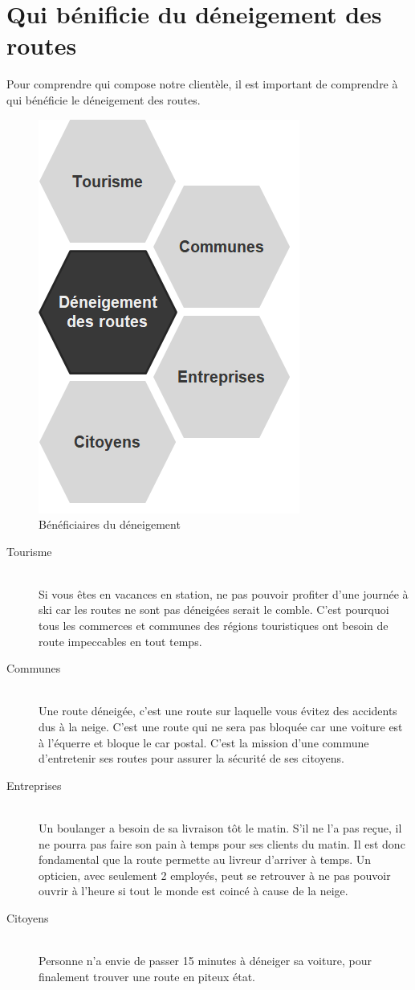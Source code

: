 \section{Qui bénificie du déneigement des routes}
Pour comprendre qui compose notre clientèle, il est important de comprendre à qui
bénéficie le déneigement des routes.

\begin{figure}[H]
    \centering
    \includegraphics[width=0.25\linewidth]{Images/business/beneficiaires.png}
    \caption[]{Bénéficiaires du déneigement}
    \label{fig:beneficiaires}
\end{figure}

\begin{description}
    \item[Tourisme] \hfill \\
    Si vous êtes en vacances en station, ne pas pouvoir profiter d'une journée à ski car
    les routes ne sont pas déneigées serait le comble. C'est pourquoi tous les commerces
    et communes des régions touristiques ont besoin de route impeccables en tout temps.
    \item[Communes] \hfill \\
    Une route déneigée, c'est une route sur laquelle vous évitez des accidents dus à la neige.
    C'est une route qui ne sera pas bloquée car une voiture est à l'équerre et bloque le car postal.
    C'est la mission d'une commune d'entretenir ses routes pour assurer la sécurité de ses citoyens.
    \item[Entreprises] \hfill \\
    Un boulanger a besoin de sa livraison tôt le matin. S'il ne l'a pas reçue, il ne pourra
    pas faire son pain à temps pour ses clients du matin. Il est donc fondamental que la route
    permette au livreur d'arriver à temps.
    Un opticien, avec seulement 2 employés, peut se retrouver à ne pas pouvoir ouvrir à l'heure
    si tout le monde est coincé à cause de la neige.
    \item[Citoyens] \hfill \\    
    Personne n'a envie de passer 15 minutes à déneiger sa voiture, pour finalement trouver une
    route en piteux état.
\end{description}

